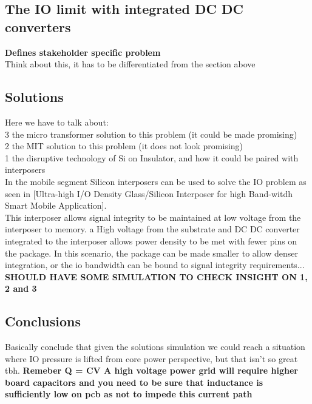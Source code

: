 \documentclass[letterpaper,twocolumn,10pt]{article}
\begin{document}
\subsection{The IO limit with integrated DC DC converters}

\textbf{Defines stakeholder specific problem}\\
Think about this, it has to be differentiated from the section above

\subsection{Solutions}

Here we have to talk about:\\
3 the micro transformer solution to this problem (it could be made promising) \\
2 the MIT solution to this problem (it does not look promising)\\
1 the disruptive technology of Si on Insulator, and how it could be paired with interposers\\
In the mobile segment Silicon interposers can be used to solve the IO problem as seen in [Ultra-high I/O Density Glass/Silicon Interposer for high Band-witdh Smart Mobile Application].\\
This interposer allows signal integrity to be maintained at low voltage from the interposer to memory. a High voltage from the substrate and DC DC converter integrated to the interposer allows power density to be met with fewer pins on the package. In this scenario, the package can be made smaller to allow denser integration, or the io bandwidth  can be bound to signal integrity requirements...\\


\textbf{SHOULD HAVE SOME SIMULATION TO CHECK INSIGHT ON 1, 2 and 3}\\

\subsection{Conclusions}

Basically conclude that given the solutions simulation we could reach a situation where IO pressure is lifted from core power perspective, but that isn't so great tbh. 
\textbf{Remeber Q = CV A high voltage power grid will require higher board capacitors and you need to be sure that inductance is sufficiently low on pcb as not to impede this current path}  


{\footnotesize 
}


\theendnotes
\end{document}
